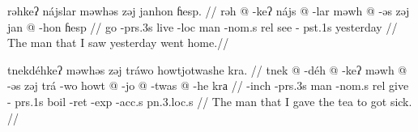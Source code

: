 \pex
\a
\begingl
\glpreamble rəhkeʔ nájslar məwhəs zəj janhon ɦesp. //
\gla rəh @ -keʔ nájs @ -lar məwh @ -əs zəj jan @ -hon ɦesp //
\glb go -{\sc prs}.3s live -{\sc loc} man -{\sc nom}.s {\sc rel} see -{\sc
pst}.1s yesterday //
\glft The man that I saw yesterday went home.//
\endgl

\a
\begingl
\glpreamble tnekdéhkeʔ məwhəs zəj tráwo howtjotwashe kra. //
\gla tnek @ -déh @ -keʔ məwh @ -əs zəj trá -wo howt @ -jo @ -twas @
-he krа //
\glb {[be ill]} -{\sc inch} -{\sc prs}.3s man -{\sc nom}.s {\sc rel} give -{\sc
prs}.1s boil -{\sc ret} -{\sc exp} -{\sc acc}.s {\sc pn}.3.{\sc loc}.s //
\glft The man that I gave the tea to got sick. //
\endgl
\xe

